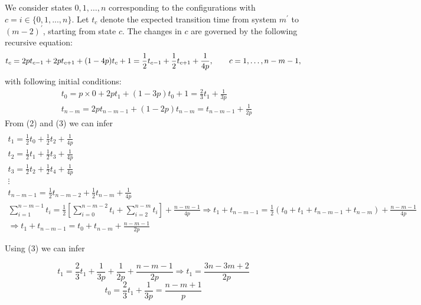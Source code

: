 \documentclass[]{book}
\theoremstyle{definition}
\begin{document}
We consider states $0, 1, \hdots, n$ corresponding to the configurations with $c = i \in \{0, 1, . . . , n\}$. Let $t_c$ denote the expected transition time from system $m^\prime$ to $(m-2)^\prime$, starting from state $c$. The changes in $c$ are governed by the following recursive equation:
\begin{equation}
    t_c 
    = 2p t_{c-1}  + 2p t_{c+1} + (1 - 4p)t_{c} + 1\\
    = \frac{1}{2}t_{c-1} + \frac{1}{2}t_{c+1} + \frac{1}{4p}, \qquad c = 1,\ldots,n-m-1,
\end{equation}
with following initial conditions:
\begin{equation}
\begin{split}
    &t_0 = p\times 0 + 2pt_1 + (1-3p)t_0  + 1 = \frac{2}{3}t_1 + \frac{1}{3p} \\
    &t_{n-m} = 2pt_{n-m-1} + \left( 1-2p \right)t_{n-m} = t_{n-m-1} + \frac{1}{2p}
\end{split}
\end{equation}
From (2) and (3) we can infer
\begin{multline*}
    \\
    t_1 = \frac{1}{2}t_0 + \frac{1}{2}t_2 + \frac{1}{4p}\\
    t_2 = \frac{1}{2}t_1 + \frac{1}{2}t_3 + \frac{1}{4p}\\
    t_3 = \frac{1}{2}t_2 + \frac{1}{2}t_4 + \frac{1}{4p}\\
    \vdots\\
    t_{n-m-1} = \frac{1}{2}t_{n-m-2} + \frac{1}{2}t_{n-m} + \frac{1}{4p}\\
    \sum_{i=1}^{n-m-1} t_i = \frac{1}{2}\left[ \sum_{i=0}^{n-m-2} t_i + \sum_{i=2}^{n-m} t_i \right] + \frac{n-m-1}{4p} \Rightarrow t_1 + t_{n-m-1} = \frac{1}{2}\left(t_0 + t_1 + t_{n-m-1} + t_{n-m}\right) + \frac{n-m-1}{4p}\\
    \Rightarrow t_1 + t_{n-m-1} = t_0 + t_{n-m} + \frac{n-m-1}{2p}
\end{multline*}

Using (3) we can infer

\begin{center}
\begin{equation}
    t_1 = \frac{2}{3}t_1 + \frac{1}{3p} + \frac{1}{2p} + \frac{n-m-1}{2p} \Rightarrow t_1 = \frac{3n-3m+2}{2p}
\end{equation}
\begin{equation}
    t_0 = \frac{2}{3}t_1 + \frac{1}{3p} = \frac{n-m+1}{p}
\end{equation}
\end{center}
\end{document}
